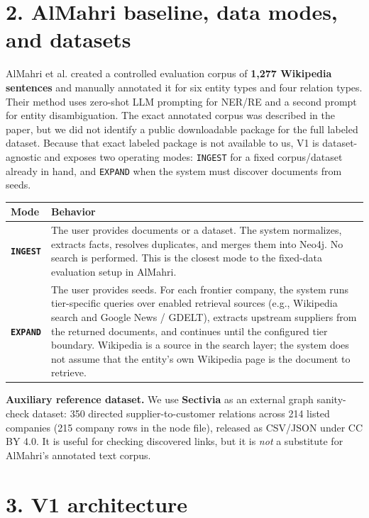 \documentclass[10pt,a4paper]{article}
\begin{document}
\section{2. AlMahri baseline, data modes, and datasets}

AlMahri et al. created a controlled evaluation corpus of \textbf{1,277 Wikipedia sentences} and manually annotated it for six entity types and four relation types. Their method uses zero-shot LLM prompting for NER/RE and a second prompt for entity disambiguation. The exact annotated corpus was described in the paper, but we did not identify a public downloadable package for the full labeled dataset. Because that exact labeled package is not available to us, V1 is dataset-agnostic and exposes two operating modes: \texttt{INGEST} for a fixed corpus/dataset already in hand, and \texttt{EXPAND} when the system must discover documents from seeds.

\begin{tabularx}{\textwidth}{>{\bfseries\sffamily}p{} X}
\toprule
Mode & Behavior \\
\midrule
\texttt{INGEST} &
The user provides documents or a dataset. The system normalizes, extracts facts, resolves duplicates, and merges them into Neo4j. No search is performed. This is the closest mode to the fixed-data evaluation setup in AlMahri. \\

\texttt{EXPAND} &
The user provides seeds. For each frontier company, the system runs tier-specific queries over enabled retrieval sources (e.g., Wikipedia search and Google News / GDELT), extracts upstream suppliers from the returned documents, and continues until the configured tier boundary. Wikipedia is a source in the search layer; the system does not assume that the entity's own Wikipedia page is the document to retrieve. \\
\bottomrule
\end{tabularx}

\textbf{Auxiliary reference dataset.} We use \textbf{Sectivia} as an external graph sanity-check dataset: 350 directed supplier-to-customer relations across 214 listed companies (215 company rows in the node file), released as CSV/JSON under CC BY 4.0. It is useful for checking discovered links, but it is \emph{not} a substitute for AlMahri's annotated text corpus.

\section{3. V1 architecture}
\end{document}
